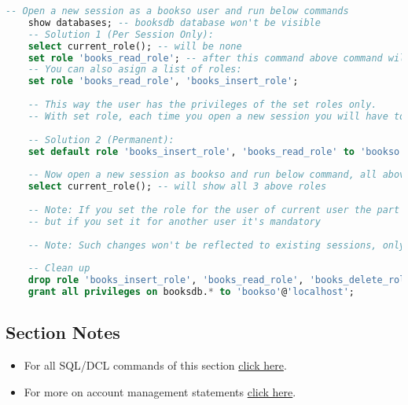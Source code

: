 \begin{lstlisting}[language=SQL]
	-- Open a new session as a bookso user and run below commands
	show databases; -- booksdb database won't be visible
	-- Solution 1 (Per Session Only):
	select current_role(); -- will be none
	set role 'books_read_role'; -- after this command above command will show new role
	-- You can also asign a list of roles:
	set role 'books_read_role', 'books_insert_role';
	
	-- This way the user has the privileges of the set roles only.
	-- With set role, each time you open a new session you will have to set again each role.
	
	-- Solution 2 (Permanent):
	set default role 'books_insert_role', 'books_read_role' to 'bookso'@'localhost';
	
	-- Now open a new session as bookso and run below command, all above roles will be listed
	select current_role(); -- will show all 3 above roles
	
	-- Note: If you set the role for the user of current user the part to 'user'@'host' is optional
	-- but if you set it for another user it's mandatory
	
	-- Note: Such changes won't be reflected to existing sessions, only on new ones (set default role)
	
	-- Clean up
	drop role 'books_insert_role', 'books_read_role', 'books_delete_role';
	grant all privileges on booksdb.* to 'bookso'@'localhost';
\end{lstlisting}
\subsection{Section Notes}
\begin{itemize}
	\item For all \acs{SQL}/\acs{DCL} commands of this section \href{file:./source-items/sql/1-sql-dcl.sql}{click here}.
	\item For more on account management statements \href{https://dev.mysql.com/doc/refman/8.0/en/account-management-statements.html}{click here}.
\end{itemize}
